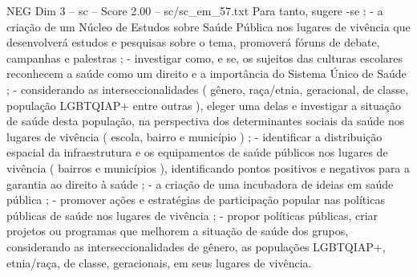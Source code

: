 \begin{textsample}{NEG Dim 3 – sc – Score 2.00 – sc/sc\_em\_57.txt}
Para tanto, sugere -se : - a criação de um Núcleo de Estudos sobre Saúde Pública nos lugares de vivência que desenvolverá estudos e pesquisas sobre o tema, promoverá fóruns de debate, campanhas e palestras ; - investigar como, e se, os sujeitos das culturas escolares reconhecem a saúde como um direito e a importância do Sistema Único de Saúde ; - considerando as interseccionalidades ( gênero, raça/etnia, geracional, de classe, população LGBTQIAP+ entre outras ), eleger uma delas e investigar a situação de saúde desta população, na perspectiva dos determinantes sociais da saúde nos lugares de vivência ( escola, bairro e município ) ; - identificar a distribuição espacial da infraestrutura e os equipamentos de saúde públicos nos lugares de vivência ( bairros e municípios ), identificando pontos positivos e negativos para a garantia ao direito à saúde ; - a criação de uma incubadora de ideias em saúde pública ; - promover ações e estratégias de participação popular nas políticas públicas de saúde nos lugares de vivência ; - propor políticas públicas, criar projetos ou programas que melhorem a situação de saúde dos grupos, considerando as interseccionalidades de gênero, as populações LGBTQIAP+, etnia/raça, de classe, geracionais, em seus lugares de vivência.

\end{textsample}
